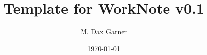 \documentclass[idxtotoc,hyperref]{packages/labbook/labbook}
\title{Template for WorkNote v0.1}
\author{M. Dax Garner}
\date{\today}
\begin{document}
  \frontmatter %
  \maketitle %
  \printindex
  
  \listofdeliv
  \newpage
  \listofreceive
  \newpage
  \listofprocess
  \newpage
  \listoffix
  \newpage
  \listoffigures
  \newpage
  \listoftables
  \newpage

  \mainmatter %
  
  
  \newpage
  \tableofcontents %

  \backmatter %

  
  
\end{document}
